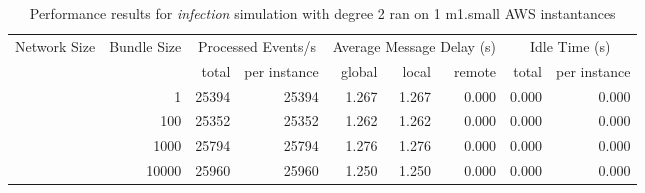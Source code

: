 \begin{table}
	  \caption[Performance results, \emph{infection:2 on 1 m1.small instances }]{ Performance results for \emph{ infection } simulation with degree 2 ran on 1 m1.small AWS instantances }
	\begin{tabular}{rrrrrrrrr}
	\hline\noalign{\smallskip}

	Network Size &
	Bundle Size &
	\multicolumn{2}{c}{Processed Events/s} & 
	\multicolumn{3}{c}{Average Message Delay (s)} & 
	\multicolumn{2}{c}{Idle Time (s)}  \\

	 & 
	 & 
	 total & per instance
     & global & local & remote
     & total & per instance\\

			
				\noalign{\smallskip}\hline
				\multirow{ 4 }{*}{ 40000 } &
				
					
					 
					\multirow{ 1 }{*}{ 1 } &
					
						
							    
							     25394  & 25394  
	                           & 1.267 & 1.267 & 0.000
	                           & 0.000 & 0.000  \\
	                
	            
					 &  
					 
					\multirow{ 1 }{*}{ 100 } &
					
						
							    
							     25352  & 25352  
	                           & 1.262 & 1.262 & 0.000
	                           & 0.000 & 0.000  \\
	                
	            
					 &  
					 
					\multirow{ 1 }{*}{ 1000 } &
					
						
							    
							     25794  & 25794  
	                           & 1.276 & 1.276 & 0.000
	                           & 0.000 & 0.000  \\
	                
	            
					 &  
					 
					\multirow{ 1 }{*}{ 10000 } &
					
						
							    
							     25960  & 25960  
	                           & 1.250 & 1.250 & 0.000
	                           & 0.000 & 0.000  \\
	                

\end{tabular}
\end{table}
